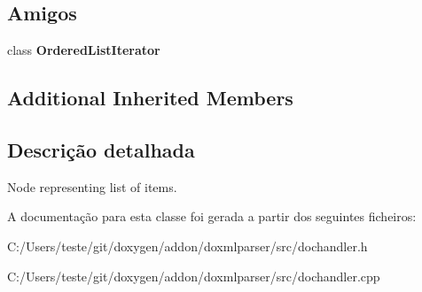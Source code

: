 \subsection*{Amigos}
\begin{DoxyCompactItemize}
\item 
\hypertarget{class_ordered_list_handler_acf24a8e48a5a671162b6c6f410c30079}{class {\bfseries Ordered\-List\-Iterator}}\label{class_ordered_list_handler_acf24a8e48a5a671162b6c6f410c30079}

\end{DoxyCompactItemize}
\subsection*{Additional Inherited Members}


\subsection{Descrição detalhada}
Node representing list of items. 



A documentação para esta classe foi gerada a partir dos seguintes ficheiros\-:\begin{DoxyCompactItemize}
\item 
C\-:/\-Users/teste/git/doxygen/addon/doxmlparser/src/dochandler.\-h\item 
C\-:/\-Users/teste/git/doxygen/addon/doxmlparser/src/dochandler.\-cpp\end{DoxyCompactItemize}
